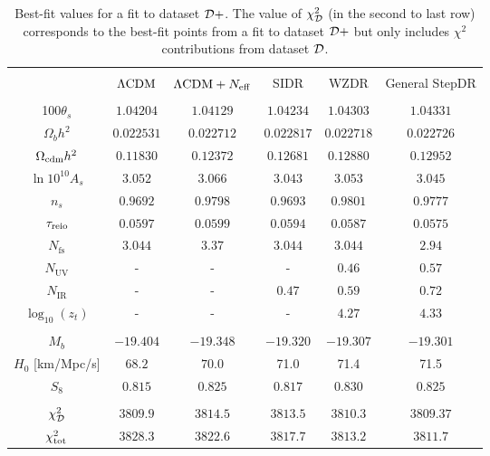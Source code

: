 \documentclass[aps,prd,twocolumn,nofootinbib,superscriptaddress]{revtex4}
\newcommand{\D}{\cal{D}}
\newcommand{\nir}{N_\text{IR}}
\newcommand{\nuv}{N_\text{UV}}
\newcommand{\nfs}{N_\text{fs}}
\newcommand{\zt}{z_t}
\newcommand{\Neff}{N_{\rm eff}}
\begin{document}
\begin{table*}[h!]{ }
	\centering
	\begin{tabular}{|c | c | c | c | c | c |} 
		\hline &&&&&\\[-8pt]
		& $\Lambda{\rm CDM}$ & $ \Lambda{\rm CDM} + \Neff$ & SIDR &  WZDR & General StepDR  \\
		\hline &&&&&\\[-8pt]
		100$\theta_s$ & $1.04204 $& $1.04129$ & $1.04234$ &$ 1.04303$ &$1.04331$  \\  [3pt]
		$\Omega_b h^2$ &$ 0.022531$& $0.022712$ & $0.022817$ & $0.022718$ &$0.022726 $ \\ [3pt]
		$ \Omega_{\rm cdm}h^2$ &$ 0.1183$0 & $0.12372 $&$ 0.12681$ & $0.12880 $&$0.12952$\\ [3pt]
		$\ln 10^{10} A_s$  &$	3.052$ & $3.066$ &$ 3.043$ & $3.053$ &$3.045$ \\ [3pt]
		$n_s$ & $0.9692$&$ 0.9798$ & $0.9693 $&$0.9801$ &$0.9777$ \\ [3pt]
		$\tau_{\rm reio}$ &$0.0597$& $0.0599 $&$ 0.0594 $& $0.0587$ &$0.0575$ \\ [3pt]
		$\nfs   $  &$3.044 $&$ 3.37$ &$ 3.044$ & $3.044$ & $2.94 $ \\ [3pt]
		$\nuv $  &-&-&-&$0.46$ &$0.57 $ \\ [3pt]			
		$\nir $  &- &-& $0.47$ &$0.59$&$0.72$  \\ [3pt]
		$\log_{10} (\zt)$  &- &- & -&$4.27$ &$4.33$\\ [3pt] \hline	 &&&&&\\[-8pt]
		$M_b $ &$ {-19.404}$ &$ {-19.348}$ &$  {-19.320}$ & $ {-19.307}$& ${-19.301}$\\ [3pt]
		$H_0$ [km/Mpc/s] & $68.2$& $ 70.0 $& 71.0& 71.4& 71.5\\ [3pt]
		$S_8$&$0.815$&$0.825$&$0.817$&$0.830$&$0.825$ \\  [3pt] \hline &&&&&\\[-8pt]
		$\chi^2_{\D}$  &$3809.9$ & $3814.5$&  $3813.5$ & $ 3810.3$ & $3809.37 $\\ [3pt]
		$\chi^2_{\rm tot}$  &$3828.3$&$ 3822.6$&  $3817.7$&  $3813.2 $& $3811.7 $\\ \hline
		
	\end{tabular}
	\caption{Best-fit values for a fit to dataset $\D+$. The value of $\chi^2_{\D}$ (in the second to last row) corresponds to the best-fit points from a fit to dataset $\D+$ but only includes  $\chi^2$ contributions from dataset $\D$. }
	\label{tb:bestfitDp}
\end{table*}
\end{document}
